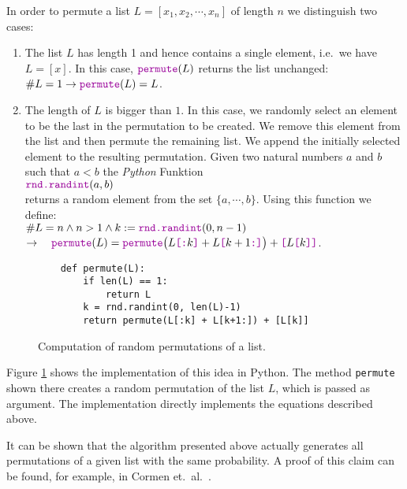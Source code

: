 In order to permute a list $L = [x_1,x_2, \cdots, x_n]$ of length $n$ we distinguish two cases:
\begin{enumerate}
\item The list  $L$ has length 1 and hence contains a single element, i.e.~we have $L = [x]$.
      In this case,  $\mytt{permute}(L)$ returns the list unchanged:
      \\[0.2cm]
      \hspace*{1.3cm}
      $\#L = 1 \rightarrow \mytt{permute}(L) = L$.
\item The length of  $L$ is bigger than  $1$.  In this case, we randomly select an element to be the last in
      the permutation to be created.  We remove this element from the list and then permute the remaining list.  
      We append the initially selected element to the resulting permutation.
      Given two natural numbers $a$ and $b$ such that $a < b$ the \textsl{Python} Funktion
      \\[0.2cm]
      \hspace*{1.3cm}
      $\mytt{rnd.randint}(a,b)$
      \\[0.2cm]
      returns a random element from the set $\{a,\cdots,b\}$.  Using this function we define:
      \\[0.2cm]
      \hspace*{0.8cm}
      $\#L = n \wedge n > 1 \wedge k :=\mytt{rnd.randint}(0,n-1) $
      \\[0.2cm]
      \hspace*{2.3cm}
      $\rightarrow\quad  
         \mytt{permute}(L) = \mytt{permute}\bigl(L\mytt{[:}k\mytt{]} + L\mytt{[}k+1\mytt{:]}\bigr) + \mytt{[}L\mytt{[}k\mytt{]]}
      $.
\end{enumerate}

\begin{figure}[!ht]
\centering
\begin{verbatim}
    def permute(L):
        if len(L) == 1:
            return L
        k = rnd.randint(0, len(L)-1)
        return permute(L[:k] + L[k+1:]) + [L[k]]
\end{verbatim}
\vspace*{-0.3cm}
\caption{Computation of random permutations of a list.}
\label{fig:Permutation.ipynb}
\end{figure}

Figure \ref{fig:Permutation.ipynb} shows the implementation of this idea in Python. The method \texttt{permute} shown
there creates a random permutation of the list $L$, which is passed as argument. The implementation directly
implements the equations described above. 

It can be shown that the algorithm presented above actually generates all permutations of a given list with the
same probability. A proof of this claim can be found, for example, in 
Cormen et.~al.~\cite{cormen:01}.



